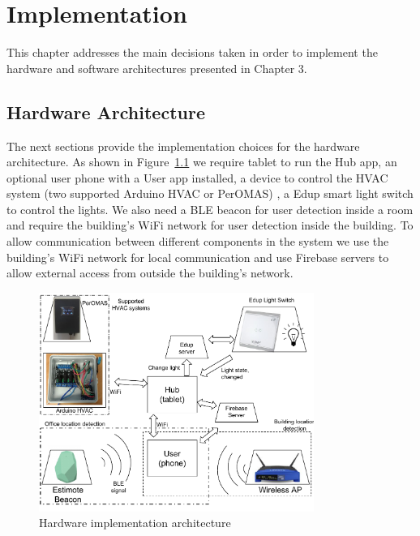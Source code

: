 \chapter{Implementation}
\label{chapter:implementation}

This chapter addresses the main decisions taken in order to implement the hardware and software architectures presented in Chapter 3.


\section{Hardware Architecture}\label{hardware_arch_imp}

The next sections provide the implementation choices for the hardware architecture. As shown in Figure~\ref{imp:architecture_system} we require tablet to run the Hub app, an optional user phone with a User app installed, a device to control the HVAC system (two supported Arduino HVAC or PerOMAS) , a Edup smart light switch to control the lights. We also need a \ac{BLE} beacon for user detection inside a room and require the building's \ac{WiFi} network for user detection inside the building.
To allow communication between different components in the system we use the building's \ac{WiFi} network for local communication and use Firebase servers to allow external access from outside the building's network.


\begin{figure}[h]
\centering
\includegraphics[width=0.8\textwidth]{Figures/harware_arch_imp}
\caption{Hardware implementation architecture}
\label{imp:architecture_system}
\end{figure}





